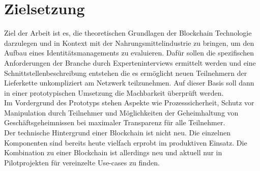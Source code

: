 \section{Zielsetzung}

Ziel der Arbeit ist es, die theoretischen Grundlagen der Blockchain Technologie darzulegen und in Kontext mit der Nahrungsmittelindustrie zu bringen, um den Aufbau eines Identitätsmanagements zu evaluieren. Dafür sollen die spezifischen Anforderungen der Branche durch Experteninterviews ermittelt werden und eine Schnittstellenbeschreibung entstehen die es ermöglicht neuen Teilnehmern der Lieferkette unkompliziert am Netzwerk teilzunehmen. Auf dieser Basis soll dann in einer prototypischen Umsetzung die Machbarkeit überprüft werden.\\

Im Vordergrund des Prototyps stehen Aspekte wie Prozesssicherheit, Schutz vor Manipulation durch Teilnehmer und Möglichkeiten der Geheimhaltung von Geschäftsgeheimnissen bei maximaler Transparenz für alle Teilnehmer.\\

Der technische Hintergrund einer Blockchain ist nicht neu. Die einzelnen Komponenten sind bereits heute vielfach erprobt im produktiven Einsatz. \cite{Diffie1976}\cite{Steinmetz2005} Die Kombination zu einer Blockchain ist allerdings neu und aktuell nur in Pilotprojekten für vereinzelte Use-cases zu finden.\\



\newpage
